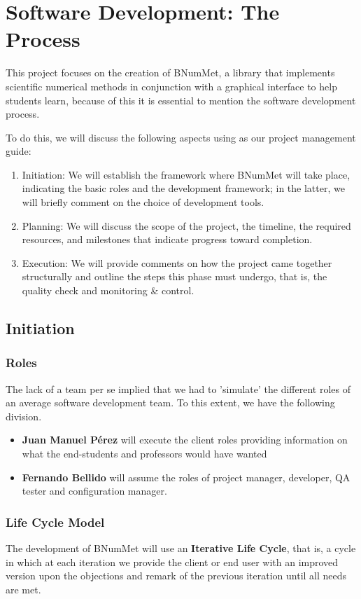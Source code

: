 \chapter{Software Development: The Process}
This project focuses on the creation of BNumMet, a library that implements scientific numerical methods in conjunction with a graphical interface to help students learn, because of this it is essential to mention the software development process. 

To do this, we will discuss the following aspects using \cite{PMBOK2013} as our project management guide:
\begin{enumerate}
    \item Initiation: We will establish the framework where BNumMet will take place, indicating the basic roles and the development framework; in the latter, we will briefly comment on the choice of development tools.
    \item Planning: We will discuss the scope of the project, the timeline, the required resources, and milestones that indicate progress toward completion.
    \item Execution: We will provide comments on how the project came together structurally and outline the steps this phase must undergo, that is, the quality check and monitoring \& control.
\end{enumerate}


\section{Initiation}
\subsection{Roles}
The lack of a team per se implied that we had to 'simulate' the different roles of an average software development team.
To this extent, we have the following division.
\begin{itemize}
    \item \textbf{Juan Manuel Pérez} will execute the client roles providing information on what the end-students and professors would have wanted
    \item \textbf{Fernando Bellido} will assume the roles of project manager, developer, QA tester and configuration manager.
\end{itemize}

\subsection{Life Cycle Model}
The development of BNumMet will use an \textbf{Iterative Life Cycle}, that is, a cycle in which at each iteration we provide the client or end user with an improved version upon the objections and remark of the previous iteration until all needs are met.

